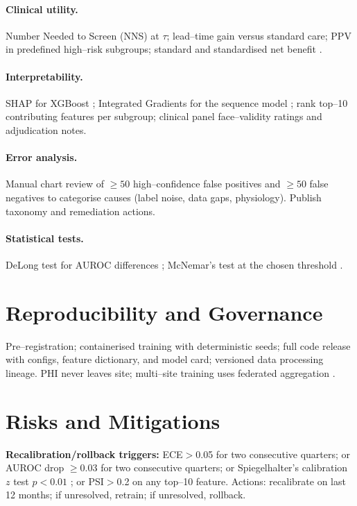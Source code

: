 \documentclass[11pt]{article}
\begin{document}
\paragraph{Clinical utility.} Number Needed to Screen (NNS) at $\tau$; lead--time gain versus standard care; PPV in predefined high--risk subgroups; standard and standardised net benefit \citep{vickers2006decision}.

\paragraph{Interpretability.} SHAP for XGBoost \citep{lundberg2017unified}; Integrated Gradients for the sequence model \citep{sundararajan2017axiomatic}; rank top--10 contributing features per subgroup; clinical panel face--validity ratings and adjudication notes.

\paragraph{Error analysis.} Manual chart review of $\ge50$ high--confidence false positives and $\ge50$ false negatives to categorise causes (label noise, data gaps, physiology). Publish taxonomy and remediation actions.

\paragraph{Statistical tests.} DeLong test for AUROC differences \citep{delong1988comparing}; McNemar's test at the chosen threshold \citep{mcnemar1947note}.

\section{Reproducibility and Governance}
Pre--registration; containerised training with deterministic seeds; full code release with configs, feature dictionary, and model card; versioned data processing lineage. PHI never leaves site; multi--site training uses federated aggregation \citep{kairouz2021advances}.

\section{Risks and Mitigations}
\textbf{Recalibration/rollback triggers:} ECE$>$0.05 for two consecutive quarters; or AUROC drop $\ge0.03$ for two consecutive quarters; or Spiegelhalter's calibration $z$ test $p<0.01$ \citep{spiegelhalter1986probabilistic}; or PSI$>$0.2 on any top--10 feature. Actions: recalibrate on last 12 months; if unresolved, retrain; if unresolved, rollback.
\end{document}
